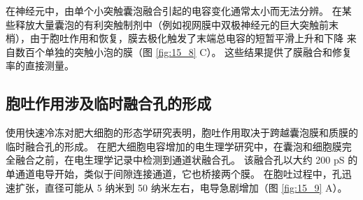 在神经元中，由单个小突触囊泡融合引起的电容变化通常太小而无法分辨。 
在某些释放大量囊泡的有利突触制剂中（例如视网膜中双极神经元的巨大突触前末梢），由于胞吐作用和恢复，膜去极化触发了末端总电容的短暂平滑上升和下降 来自数百个单独的突触小泡的膜（图 \ref{fig:15_8} C）。 
这些结果提供了膜融合和修复率的直接测量。


\subsection{胞吐作用涉及临时融合孔的形成}

使用快速冷冻对肥大细胞的形态学研究表明，胞吐作用取决于跨越囊泡膜和质膜的临时融合孔的形成。 
在肥大细胞电容增加的电生理学研究中，在囊泡和细胞膜完全融合之前，在电生理学记录中检测到通道状融合孔。 
该融合孔以大约 200 pS 的单通道电导开始，类似于间隙连接通道，它也桥接两个膜。 
在胞吐过程中，孔迅速扩张，直径可能从 5 纳米到 50 纳米左右，电导急剧增加（图 \ref{fig:15_9} A）。

